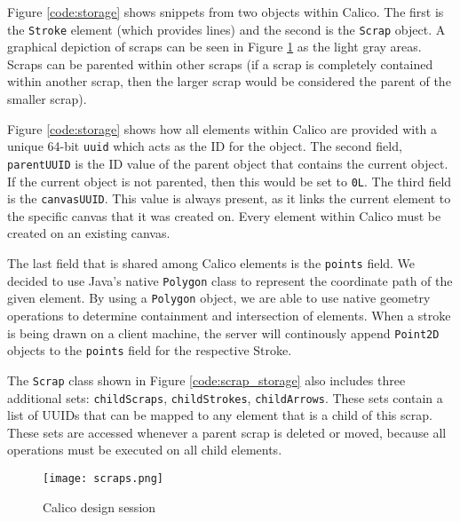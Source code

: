 Figure \ref{code:storage} shows snippets from two objects within Calico. The first is the \texttt{Stroke} element (which provides lines) and the second is the \texttt{Scrap} object. A graphical depiction of scraps can be seen in Figure \ref{fig:scraps_storage} as the light gray areas. Scraps can be parented within other scraps (if a scrap is completely contained within another scrap, then the larger scrap would be considered the parent of the smaller scrap).

Figure \ref{code:storage} shows how all elements within Calico are provided with a unique 64-bit \texttt{uuid} which acts as the ID for the object. The second field, \texttt{parentUUID} is the ID value of the parent object that contains the current object. If the current object is not parented, then this would be set to \texttt{0L}. The third field is the \texttt{canvasUUID}. This value is always present, as it links the current element to the specific canvas that it was created on. Every element within Calico must be created on an existing canvas. 

The last field that is shared among Calico elements is the \texttt{points} field. We decided to use Java's native \texttt{Polygon} class to represent the coordinate path of the given element. By using a \texttt{Polygon} object, we are able to use native geometry operations to determine containment and intersection of elements. When a stroke is being drawn on a client machine, the server will continously append \texttt{Point2D} objects to the \texttt{points} field for the respective Stroke. 

The \texttt{Scrap} class shown in Figure \ref{code:scrap_storage} also includes three additional sets: \texttt{childScraps}, \texttt{childStrokes}, \texttt{childArrows}. These sets contain a list of UUIDs that can be mapped to any element that is a child of this scrap. These sets are accessed whenever a parent scrap is deleted or moved, because all operations must be executed on all child elements.


\begin{figure}[h!]
  \centering
  \texttt{[image: scraps.png]}
  \caption{Calico design session}
  \label{fig:scraps_storage}
\end{figure}

